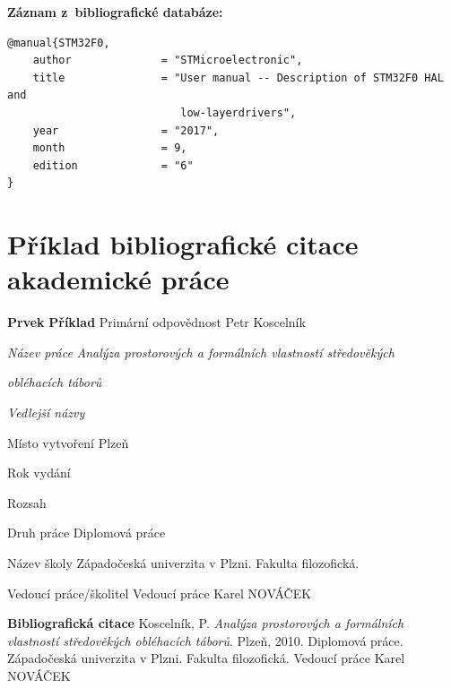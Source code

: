\bigskip \bigskip
\noindent \textbf{Záznam z~bibliografické databáze:}
\vspace{-0.5em}
\begin{verbatim}
@manual{STM32F0,
    author              = "STMicroelectronic",
    title               = "User manual -- Description of STM32F0 HAL and 
                           low-layerdrivers",
    year                = "2017",
    month               = 9,
    edition             = "6"
}
\end{verbatim}


\newpage
\section*{Příklad bibliografické citace akademické práce}
\label{pr-akademicka-prace1}
\begin{tabbing} 
\zarazky
\textbf{Prvek} \> \textbf{Příklad} \odradkovani
Primární odpovědnost \>
Petr {\sc Koscelník}

\odradkovani
{\em Název práce} \>
{\em Analýza prostorových a formálních vlastností středověkých}

   \odradkovani \>
   {\em obléhacích táborů}

\odradkovani
{\em Vedlejší názvy}\footnotemark[1]

\odradkovani
Místo vytvoření \>
Plzeň

\odradkovani
Rok vydání 

\odradkovani
Rozsah\footnotemark[1] \>

\odradkovani
Druh práce \>
Diplomová práce

\odradkovani
Název školy \>
Západočeská univerzita v Plzni. Fakulta filozofická.

\odradkovani
Vedoucí práce/školitel\footnotemark[1]\>
Vedoucí práce Karel {\sc NOVÁČEK}

\odradkovani
\end{tabbing}

\noindent \textbf{Bibliografická citace} \odradkovani
{\sc Koscelník}, P. {\em Analýza prostorových a formálních vlastností středověkých obléhacích táborů}. Plzeň, 2010. Diplomová práce. Západočeská univerzita v Plzni. Fakulta filozofická. Vedoucí práce Karel {\sc NOVÁČEK}

